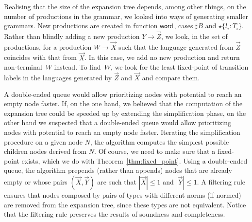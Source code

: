 Realising that the size of the expansion tree depends, among other
things, on the number of productions in the grammar, we looked into
ways of generating smaller grammars. New productions are created in
function $\mathsf{word}$, cases $\sharp B$ and $\star\{l_i\colon
T_i\}$. Rather than blindly adding a new production
$Y \rightarrow \vec Z$, we look, in the set of productions, for a
production $W \rightarrow \vec X$ such that the language generated
from $\vec Z$ coincides with that from $\vec X$. In this
case, we add no new production and return non-terminal~$W$ instead. To
find~$W$, we look for the least fixed-point of transition labels in the
languages generated by $\vec Z$ and $\vec X$ and compare them.



A double-ended queue would allow prioritizing nodes with potential to
reach an empty node faster.
%
%
%
%
%
If, on the one hand, we believed that the computation of the expansion
tree could be speeded up by extending the simplification phase, on the
other hand we suspected that a double-ended queue would allow
prioritizing nodes with potential to reach an empty node faster.
%
Iterating the simplification procedure on a given node $N$, the
algorithm computes the simplest possible children nodes derived from
$N$. Of course, we need to make sure that a fixed-point exists, which
we do with Theorem~\ref{thm:fixed_point}.
%
Using a double-ended queue, the algorithm prepends (rather than
appends) nodes that are already empty or whose pairs $(\vec X, \vec Y)$
are such that $|\vec X|\leq 1$ and $|\vec Y| \leq 1$. A filtering rule
ensures that nodes composed by pairs of types with different norms (if normed)
are removed from the expansion tree, since these types are not equivalent. 
Notice that the filtering rule preserves the results of soundness and 
completeness.
%



